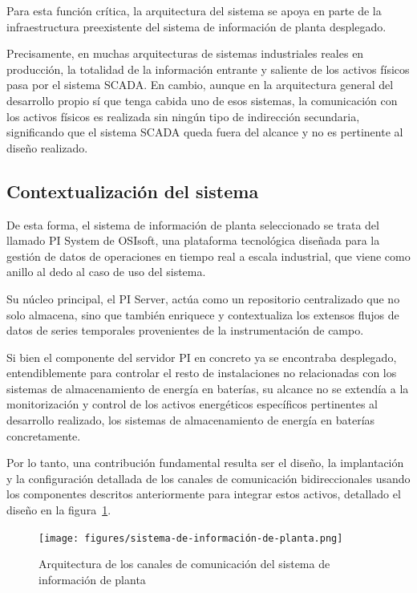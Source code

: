 Para esta función crítica, la arquitectura del sistema se apoya en parte de la infraestructura preexistente del sistema de información de planta desplegado.

Precisamente, en muchas arquitecturas de sistemas industriales reales en producción, la totalidad de la información entrante y saliente de los activos físicos pasa por el sistema SCADA. En cambio, aunque en la arquitectura general del desarrollo propio sí que tenga cabida uno de esos sistemas, la comunicación con los activos físicos es realizada sin ningún tipo de indirección secundaria, significando que el sistema SCADA queda fuera del alcance y no es pertinente al diseño realizado.

\subsection{Contextualización del sistema}
\label{makereference3.4.1}

De esta forma, el sistema de información de planta seleccionado se trata del llamado PI System de OSIsoft, una plataforma tecnológica diseñada para la gestión de datos de operaciones en tiempo real a escala industrial, que viene como anillo al dedo al caso de uso del sistema.

Su núcleo principal, el PI Server, actúa como un repositorio centralizado que no solo almacena, sino que también enriquece y contextualiza los extensos flujos de datos de series temporales provenientes de la instrumentación de campo.

Si bien el componente del servidor PI en concreto ya se encontraba desplegado, entendiblemente para controlar el resto de instalaciones no relacionadas con los sistemas de almacenamiento de energía en baterías, su alcance no se extendía a la monitorización y control de los activos energéticos específicos pertinentes al desarrollo realizado, los sistemas de almacenamiento de energía en baterías concretamente.

Por lo tanto, una contribución fundamental resulta ser el diseño, la implantación y la configuración detallada de los canales de comunicación bidireccionales usando los componentes descritos anteriormente para integrar estos activos, detallado el diseño en la figura~\ref{fig:sistema-de-información-de-planta}.

\begin{figure}
\centering
\texttt{[image: figures/sistema-de-información-de-planta.png]}
\caption{Arquitectura de los canales de comunicación del sistema de información de planta}
\label{fig:sistema-de-información-de-planta}
\end{figure}

